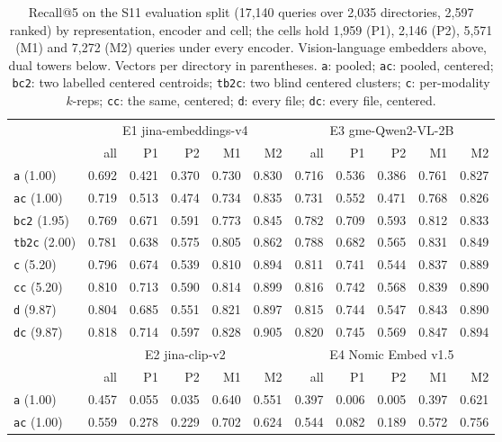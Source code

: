 \documentclass[11pt]{article}
\newcommand{\rep}[1]{\texttt{#1}}
\begin{document}
\begin{table}[t]
\centering\small
\caption{Recall@5 on the S11 evaluation split (17,140 queries over 2,035 directories, 2,597 ranked) by representation, encoder and cell; the cells hold 1,959 (P1), 2,146 (P2), 5,571 (M1) and 7,272 (M2) queries under every encoder. Vision-language embedders above, dual towers below. Vectors per directory in parentheses. \rep{a}: pooled; \rep{ac}: pooled, centered; \rep{bc2}: two labelled centered centroids; \rep{tb2c}: two blind centered clusters; \rep{c}: per-modality $k$-reps; \rep{cc}: the same, centered; \rep{d}: every file; \rep{dc}: every file, centered.}
\label{tab:cells}
\setlength{\tabcolsep}{4pt}
\begin{tabular}{lrrrrrrrrrr}
\toprule
& \multicolumn{5}{c}{E1 jina-embeddings-v4} & \multicolumn{5}{c}{E3 gme-Qwen2-VL-2B} \\
\cmidrule(lr){2-6}\cmidrule(lr){7-11}
 & all & P1 & P2 & M1 & M2 & all & P1 & P2 & M1 & M2 \\
\midrule
\rep{a} (1.00) & 0.692 & 0.421 & 0.370 & 0.730 & 0.830 & 0.716 & 0.536 & 0.386 & 0.761 & 0.827 \\
\rep{ac} (1.00) & 0.719 & 0.513 & 0.474 & 0.734 & 0.835 & 0.731 & 0.552 & 0.471 & 0.768 & 0.826 \\
\rep{bc2} (1.95) & 0.769 & 0.671 & 0.591 & 0.773 & 0.845 & 0.782 & 0.709 & 0.593 & 0.812 & 0.833 \\
\rep{tb2c} (2.00) & 0.781 & 0.638 & 0.575 & 0.805 & 0.862 & 0.788 & 0.682 & 0.565 & 0.831 & 0.849 \\
\rep{c} (5.20) & 0.796 & 0.674 & 0.539 & 0.810 & 0.894 & 0.811 & 0.741 & 0.544 & 0.837 & 0.889 \\
\rep{cc} (5.20) & 0.810 & 0.713 & 0.590 & 0.814 & 0.899 & 0.816 & 0.742 & 0.568 & 0.839 & 0.890 \\
\rep{d} (9.87) & 0.804 & 0.685 & 0.551 & 0.821 & 0.897 & 0.815 & 0.744 & 0.547 & 0.843 & 0.890 \\
\rep{dc} (9.87) & 0.818 & 0.714 & 0.597 & 0.828 & 0.905 & 0.820 & 0.745 & 0.569 & 0.847 & 0.894 \\
\midrule
 & \multicolumn{5}{c}{E2 jina-clip-v2} & \multicolumn{5}{c}{E4 Nomic Embed v1.5} \\
\cmidrule(lr){2-6}\cmidrule(lr){7-11}
 & all & P1 & P2 & M1 & M2 & all & P1 & P2 & M1 & M2 \\
\midrule
\rep{a} (1.00) & 0.457 & 0.055 & 0.035 & 0.640 & 0.551 & 0.397 & 0.006 & 0.005 & 0.397 & 0.621 \\
\rep{ac} (1.00) & 0.559 & 0.278 & 0.229 & 0.702 & 0.624 & 0.544 & 0.082 & 0.189 & 0.572 & 0.756 \\

\end{tabular}
\end{table}
\end{document}
